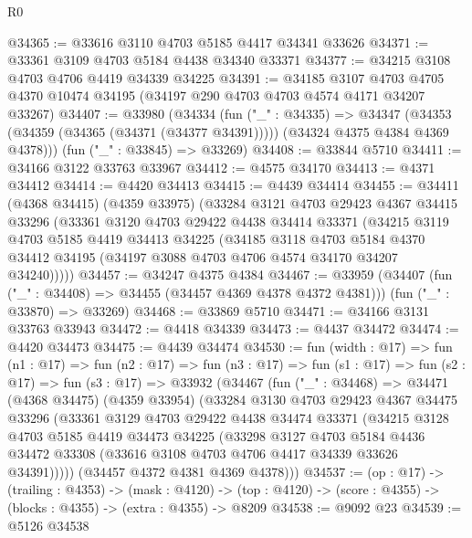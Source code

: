 \begin{lexlean}{R0}
\begin{coremodule}
@34365 := @33616 @3110 @4703 @5185 @4417 @34341 @33626
@34371 := @33361 @3109 @4703 @5184 @4438 @34340 @33371
@34377 := @34215 @3108 @4703 @4706 @4419 @34339 @34225
@34391 := @34185
    @3107
    @4703
    @4705
    @4370
    @10474
    @34195
    (@34197 @290 @4703 @4703 @4574 @4171 @34207 @33267)
@34407 := @33980
    (@34334
      (fun ("_" : @34335) =>
      @34347 (@34353 (@34359 (@34365 (@34371 (@34377 @34391))))) (@34324 @4375 @4384 @4369 @4378)))
    (fun ("_" : @33845) => @33269)
@34408 := @33844 @5710
@34411 := @34166 @3122 @33763 @33967
@34412 := @4575 @34170
@34413 := @4371 @34412
@34414 := @4420 @34413
@34415 := @4439 @34414
@34455 := @34411
    (@4368 @34415)
    (@4359 @33975)
    (@33284
      @3121
      @4703
      @29423
      @4367
      @34415
      @33296
      (@33361
        @3120
        @4703
        @29422
        @4438
        @34414
        @33371
        (@34215
          @3119
          @4703
          @5185
          @4419
          @34413
          @34225
          (@34185
            @3118
            @4703
            @5184
            @4370
            @34412
            @34195
            (@34197 @3088 @4703 @4706 @4574 @34170 @34207 @34240)))))
@34457 := @34247 @4375 @4384
@34467 := @33959
    (@34407 (fun ("_" : @34408) => @34455 (@34457 @4369 @4378 @4372 @4381)))
    (fun ("_" : @33870) => @33269)
@34468 := @33869 @5710
@34471 := @34166 @3131 @33763 @33943
@34472 := @4418 @34339
@34473 := @4437 @34472
@34474 := @4420 @34473
@34475 := @4439 @34474
@34530 := fun (width : @17) =>
  fun (n1 : @17) =>
  fun (n2 : @17) =>
  fun (n3 : @17) =>
  fun (s1 : @17) =>
  fun (s2 : @17) =>
  fun (s3 : @17) =>
  @33932
    (@34467
      (fun ("_" : @34468) =>
      @34471
        (@4368 @34475)
        (@4359 @33954)
        (@33284
          @3130
          @4703
          @29423
          @4367
          @34475
          @33296
          (@33361
            @3129
            @4703
            @29422
            @4438
            @34474
            @33371
            (@34215
              @3128
              @4703
              @5185
              @4419
              @34473
              @34225
              (@33298
                @3127
                @4703
                @5184
                @4436
                @34472
                @33308
                (@33616 @3108 @4703 @4706 @4417 @34339 @33626 @34391)))))
        (@34457 @4372 @4381 @4369 @4378)))
@34537 := (op : @17) ->
  (trailing : @4353) ->
  (mask : @4120) -> (top : @4120) -> (score : @4355) -> (blocks : @4355) -> (extra : @4355) -> @8209
@34538 := @9092 @23
@34539 := @5126 @34538

\end{coremodule}
\end{lexlean}
